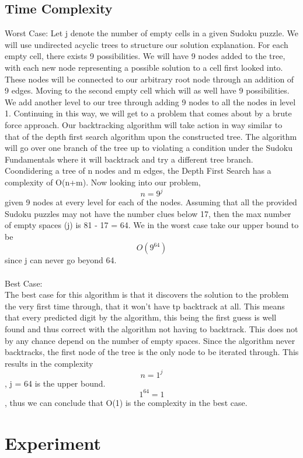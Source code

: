 \documentclass[12pt]{article}
\begin{document}
\subsection{Time Complexity}
Worst Case:
Let j denote the number of empty cells in a given Sudoku puzzle. We will use undirected acyclic trees to structure our solution explanation. For each empty cell, there exists 9 possibilities. We will have 9 nodes added to the tree, with each new node representing a possible solution to a cell first looked into. These nodes will be connected to our arbitrary root node through an addition of 9 edges. Moving to the second empty cell which will as well have 9 possibilities. We add another level to our tree through adding 9 nodes to all the nodes in level 1. Continuing in this way, we will get to a problem that comes about by a brute force approach. Our backtracking algorithm will take action in way similar to that of the depth first search algorithm upon the constructed tree. The algorithm will go over one branch of the tree up to violating a condition under the Sudoku Fundamentals where it will backtrack and try a different tree branch. Coondidering a tree of n nodes and m edges, the Depth First Search has a complexity of O(n+m). Now looking into our problem, \[n = 9^{j}\] given 9 nodes at every level for each of the nodes. Assuming that all the provided Sudoku puzzles may not have the number clues below 17, then the max number of empty spaces (j) is 81 - 17 = 64. We in the worst case take our upper bound to be \[O(9^{64})\] since j can never go beyond 64.\\\\        
Best Case:\\
The best case for this algorithm is that it discovers the solution to the problem the very first time through, that it won't have tp backtrack at all. This means that every predicted digit by the algorithm, this being the first guess is well found and thus correct with the algorithm not having to backtrack. This does not by any chance depend on the number of empty spaces. Since the algorithm never backtracks, the first node of the tree is the only node to be iterated through. This results in the complexity \[n=1^{j}\], j = 64 is the upper bound. \[1^{64} = 1\], thus we can conclude that O(1) is the complexity in the best case.


\section{Experiment}
\end{document}
